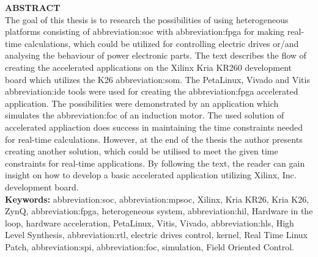 \documentclass[a4paper, twoside, 11pt]{article}
\begin{document}
\begin{minipage}[t]{7.37cm}
		\textcolor{ctublue}{\Large{\textbf{\MakeTextUppercase{Abstract}}}}\\
		The goal of this thesis is to research the possibilities of using heterogeneous platforms consisting of \gls{abbreviation:soc} with \gls{abbreviation:fpga} for making real-time calculations, which could be utilized for controlling electric drives or/and analysing the behaviour of power electronic parts. The text describes the flow of creating the accelerated applications on the Xilinx Kria KR260 development board which utilizes the K26 \gls{abbreviation:som}. The PetaLinux, Vivado and Vitis \gls{abbreviation:ide} tools were used for creating the \gls{abbreviation:fpga} accelerated application. The possibilities were demonstrated by an application which simulates the \gls{abbreviation:foc} of an induction motor. The used solution of accelerated appliaction does success in maintaining the time constraints needed for real-time calculations. However, at the end of the thesis the author presents creating another solution, which could be utilised to meet the given time constraints for real-time applications. By following the text, the reader can gain insight on how to develop a basic accelerated application utilizing Xilinx, Inc. development board.\\
		\textbf{Keywords:} \gls{abbreviation:soc}, \gls{abbreviation:mpsoc}, Xilinx, Kria KR26, Kria K26, ZynQ, \gls{abbreviation:fpga}, heterogeneous system, \gls{abbreviation:hil}, Hardware in the loop, hardware acceleration, PetaLinux, Vitis, Vivado, \gls{abbreviation:hls}, High Level Synthesis, \gls{abbreviation:rtl}, electric drives control, kernel, Real Time Linux Patch, \gls{abbreviation:spi}, \gls{abbreviation:foc}, simulation, Field Oriented Control.
\end{minipage}


\newpage
\tableofcontents
\newpage%
\flushbottom %
\newpage
\vspace{0pt}
\listoffigures %
\flushbottom %
\newpage
\listoftables
\flushbottom
\newpage


\null\newpage
\setcounter{page}{1}
\end{document}
